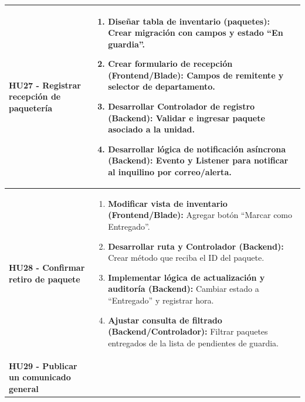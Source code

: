 \begin{longtable}{|p{4.5cm}|p{10.5cm}|}
    \\ \hline

        \textbf{HU27 - Registrar recepción de paquetería} 
        
        & 

            \begin{enumerate}[leftmargin=*,nosep]
                \item \textbf{Diseñar tabla de inventario (paquetes):} Crear migración con campos y estado ``En guardia''.
                \item \textbf{Crear formulario de recepción (Frontend/Blade):} Campos de remitente y selector de departamento.
                \item \textbf{Desarrollar Controlador de registro (Backend):} Validar e ingresar paquete asociado a la unidad.
                \item \textbf{Desarrollar lógica de notificación asíncrona (Backend):} Evento y Listener para notificar al inquilino por correo/alerta.
            \end{enumerate} 
        
    \\ \hline

        \textbf{HU28 - Confirmar retiro de paquete} 
        
        & 

            \begin{enumerate}[leftmargin=*,nosep]
                \item \textbf{Modificar vista de inventario (Frontend/Blade):} Agregar botón ``Marcar como Entregado''.
                \item \textbf{Desarrollar ruta y Controlador (Backend):} Crear método que reciba el ID del paquete.
                \item \textbf{Implementar lógica de actualización y auditoría (Backend):} Cambiar estado a ``Entregado'' y registrar hora.
                \item \textbf{Ajustar consulta de filtrado (Backend/Controlador):} Filtrar paquetes entregados de la lista de pendientes de guardia.
            \end{enumerate} 
        
    \\ \hline

        \textbf{HU29 - Publicar un comunicado general} 
        
        & 


\end{longtable}
